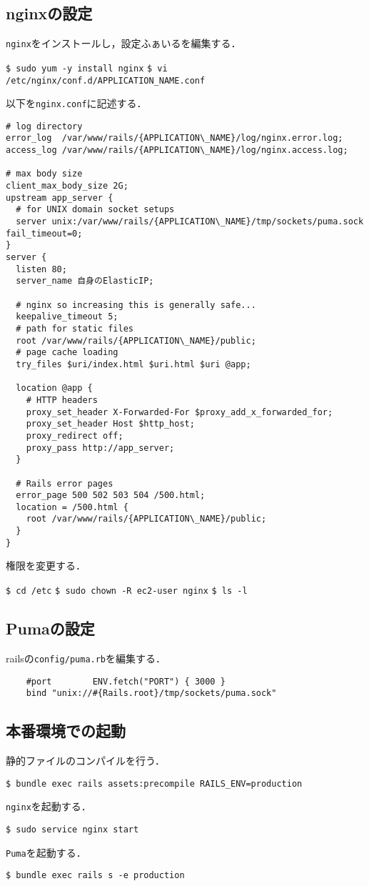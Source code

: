 \subsection{nginxの設定}
\texttt{nginx}をインストールし，設定ふぁいるを編集する．
\begin{screen}
    \texttt{\$ sudo yum -y install nginx}
    \texttt{\$ vi /etc/nginx/conf.d/APPLICATION\_NAME.conf}
\end{screen}
以下を\texttt{nginx.conf}に記述する．
\begin{screen}
    \begin{lstlisting}
# log directory
error_log  /var/www/rails/{APPLICATION\_NAME}/log/nginx.error.log; 
access_log /var/www/rails/{APPLICATION\_NAME}/log/nginx.access.log;

# max body size
client_max_body_size 2G;
upstream app_server {
  # for UNIX domain socket setups
  server unix:/var/www/rails/{APPLICATION\_NAME}/tmp/sockets/puma.sock fail_timeout=0; 
}
server {
  listen 80;
  server_name 自身のElasticIP;

  # nginx so increasing this is generally safe...
  keepalive_timeout 5;
  # path for static files
  root /var/www/rails/{APPLICATION\_NAME}/public;
  # page cache loading
  try_files $uri/index.html $uri.html $uri @app;

  location @app {
    # HTTP headers
    proxy_set_header X-Forwarded-For $proxy_add_x_forwarded_for;
    proxy_set_header Host $http_host;
    proxy_redirect off;
    proxy_pass http://app_server;
  }

  # Rails error pages
  error_page 500 502 503 504 /500.html;
  location = /500.html {
    root /var/www/rails/{APPLICATION\_NAME}/public; 
  }
}
\end{lstlisting}
\end{screen}
権限を変更する．
\begin{screen}
    \texttt{\$ cd /etc}
    \texttt{\$ sudo chown -R ec2-user nginx}
    \texttt{\$ ls -l}
\end{screen}

\subsection{Pumaの設定}
railsの\texttt{config/puma.rb}を編集する．
\begin{lstlisting}
    #port        ENV.fetch("PORT") { 3000 }
    bind "unix://#{Rails.root}/tmp/sockets/puma.sock"       
\end{lstlisting}

\subsection{本番環境での起動}
静的ファイルのコンパイルを行う．
\begin{screen}
    \texttt{\$ bundle exec rails assets:precompile RAILS\_ENV=production}
\end{screen}
\texttt{nginx}を起動する．
\begin{screen}
    \texttt{\$ sudo service nginx start}
\end{screen}
\texttt{Puma}を起動する．
\begin{screen}
    \texttt{\$ bundle exec rails s -e production}
\end{screen}